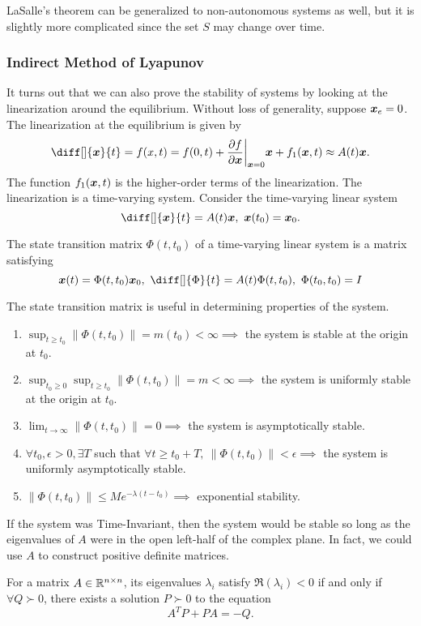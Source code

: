 LaSalle's theorem can be generalized to non-autonomous systems as well, but it
is slightly more complicated since the set $S$ may change over time.

\subsubsection{Indirect Method of Lyapunov}
It turns out that we can also prove the stability of systems by looking at the
linearization around the equilibrium. Without loss of generality, suppose
$\boldsymbol{x}_e = 0$. The linearization at the equilibrium is given by \[
	\diff[]{\bs{x}}{t} = f(x,t) = f(0, t) + \frac{\partial f}{\partial
	\bs{x}}\bigg\lvert_{\bs{x} = 0}\bs{x} + f_1(\bs{x},t) \approx A(t)\bs{x}.
\]
The function $f_1(\boldsymbol{x}, t)$ is the higher-order terms of the linearization.
The linearization is a time-varying system.
Consider the time-varying linear system
\[
	\diff[]{\bs{x}}{t} = A(t)\bs{x},\ \bs{x}(t_0) = \bs{x}_0.
\]
\begin{definition}
	The state transition matrix $\Phi(t, t_0)$ of a time-varying linear system is
	a matrix satisfying \[
		\bs{x}(t) = \Phi(t, t_0)\bs{x}_0,\ \diff[]{\Phi}{t} = A(t)\Phi(t, t_0),\
		\Phi(t_0, t_0) = I
	\]
	\label{defn:state-transition-matrix}
\end{definition}
The state transition matrix is useful in determining properties of the system.
\begin{enumerate}
	\item $\sup_{t\geq t_0} \|\Phi(t, t_0)\| = m(t_0) < \infty \implies$ the system
		is stable at the origin at $t_0$.
	\item $\sup_{t_0\geq 0}\sup_{t\geq t_0} \|\Phi(t, t_0)\| = m < \infty \implies$ the system
		is uniformly stable at the origin at $t_0$.
	\item $\lim_{t\to\infty}\|\Phi(t, t_0)\| = 0 \implies$ the system is
		asymptotically stable.
	\item $\forall t_0,\epsilon>0,\exists T$ such that $\forall t\geq t_0 + T,\ \|\Phi(t, t_0)\| <
		\epsilon \implies$ the system is uniformly asymptotically stable.
	\item $\|\Phi(t, t_0)\| \leq Me^{-\lambda(t-t_0)} \implies$ exponential
		stability.
\end{enumerate}
If the system was Time-Invariant, then the system would be stable so long as the
eigenvalues of $A$ were in the open left-half of the complex plane. In fact, we
could use $A$ to construct positive definite matrices.
\begin{theorem}
	For a matrix $A\in \mathbb{R}^{n\times n}$, its eigenvalues $\lambda_i$ satisfy
	$\Re(\lambda_i) < 0$ if and only if $\forall Q \succ 0$, there exists
	a solution $P\succ 0$ to the equation \[
		A^TP + PA = -Q.
	\]
	\label{thm:lyapunov-lemma}
\end{theorem}
